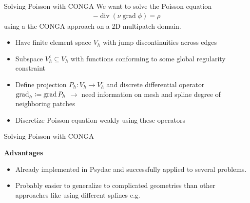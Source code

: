 \documentclass[
	english,%
	logo=false,%
	eurofusion=false, %
	titlegraphic=true, %
	]{ippbeamer}
\DeclareMathOperator{\grad}{grad}
\DeclareMathOperator{\diver}{div}
\begin{document}
\begin{frame}{Solving Poisson with CONGA}
	We want to solve the Poisson equation
	\begin{align*}
		-\diver (\nu \grad \phi) = \rho
	\end{align*}
	using a the CONGA approach on a 2D multipatch domain. 
	\begin{itemize}
		\item Have finite element space $V_h$ with jump discontinuities across edges
		\item Subspace $V_h^c \subseteq V_h$ with functions conforming to some global
				regularity constraint
		\item Define projection $P_h: V_h \rightarrow V_h^c$
				and discrete differential operator $\grad_h \vcentcolon= \grad P_h$
				$\rightarrow$ need information on mesh and spline degree of neighboring patches
		\item Discretize Poisson equation weakly using these operators
	\end{itemize}
\end{frame}

\begin{frame}{Solving Poisson with CONGA}
	\vspace*{1.5cm}
	\begin{alertblock}{\textbf{Advantages}}
		\begin{itemize}
			\item Already implemented in Psydac and successfully applied to several problems. 
			\item Probably easier to generalize to complicated geometries than other approaches
					like using different splines e.g.
		\end{itemize}
	\end{alertblock}
\end{frame}
\end{document}
